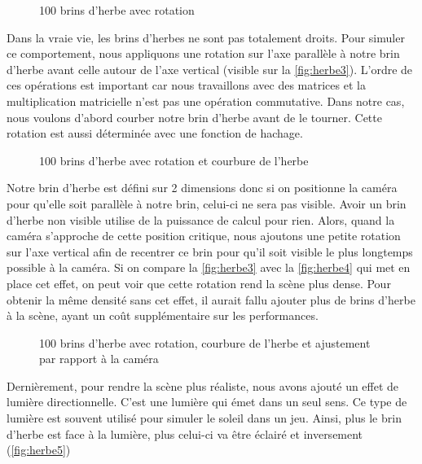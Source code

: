 \begin{figure}[H]			
	\caption{100 brins d'herbe avec rotation}
	\label{fig:herbe2}
\end{figure}

Dans la vraie vie, les brins d'herbes ne sont pas totalement droits. Pour simuler ce comportement, nous appliquons une rotation sur l'axe parallèle à notre brin d'herbe avant celle autour de l'axe vertical (visible sur la \autoref{fig:herbe3}). L'ordre de ces opérations est important car nous travaillons avec des matrices et la multiplication matricielle n'est pas une opération commutative. Dans notre cas, nous voulons d'abord courber notre brin d'herbe avant de le tourner.  Cette rotation est aussi déterminée avec une fonction de hachage.

\begin{figure}[H]			
	\caption{100 brins d'herbe avec rotation et courbure de l'herbe}
	\label{fig:herbe3}
\end{figure}

Notre brin d'herbe est défini sur 2 dimensions donc si on positionne la caméra pour qu'elle soit parallèle à notre brin, celui-ci ne sera pas visible. Avoir un brin d'herbe non visible utilise de la puissance de calcul pour rien. Alors, quand la caméra s'approche de cette position critique, nous ajoutons une petite rotation sur l'axe vertical afin de recentrer ce brin pour qu'il soit visible le plus longtemps possible à la caméra. Si on compare la \autoref{fig:herbe3} avec la \autoref{fig:herbe4} qui met en place cet effet, on peut voir que cette rotation rend la scène plus dense. Pour obtenir la même densité sans cet effet, il aurait fallu ajouter plus de brins d'herbe à la scène, ayant un coût supplémentaire sur les performances.  

\begin{figure}[H]			
	\caption{100 brins d'herbe avec rotation, courbure de l'herbe et ajustement par rapport à la caméra}
	\label{fig:herbe4}
\end{figure}


Dernièrement, pour rendre la scène plus réaliste, nous avons ajouté un effet de lumière directionnelle. C'est une lumière qui émet dans un seul sens. Ce type de lumière est souvent utilisé pour simuler le soleil dans un jeu. Ainsi, plus le brin d'herbe est face à la lumière, plus celui-ci va être éclairé et inversement (\autoref{fig:herbe5})

